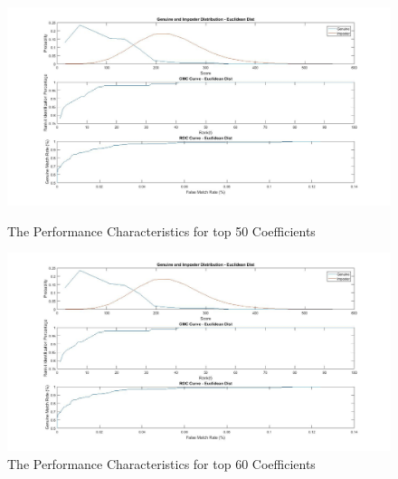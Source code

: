 \documentclass[conference]{IEEEtran}
\begin{document}
\begin{enumerate}
\begin{figure}
\centering
\includegraphics[width=20cm]{forTop50Coeffecients.jpg}
\caption{The Performance Characteristics for top 50 Coefficients}
\label{top50Coef}
\includegraphics[width=20cm]{forTop60Coeffecients.jpg}
\caption{The Performance Characteristics for top 60 Coefficients}
\label{top60Coef}
\end{figure}



\end{enumerate}
\end{document}

